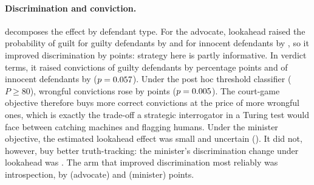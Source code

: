 \paragraph{Discrimination and conviction.}
 decomposes the effect by defendant type. For the advocate, lookahead raised the probability of guilt
for guilty defendants by \AdvLookG{} and for innocent defendants by \AdvLookI{}, so it improved discrimination by
\DiscChgAdvLook{} points: strategy here is partly informative. In verdict terms, it raised convictions of guilty
defendants by \ConvAdvLookG{} percentage points and of innocent defendants by \ConvAdvLookI{} ($p=0.057$).
Under the post hoc threshold classifier ($P\ge80$), wrongful convictions rose by \ConvThrAdvLookI{} points
($p=0.005$). The court-game objective therefore buys more correct convictions at the price of more
wrongful ones, which is exactly the trade-off a strategic interrogator in a Turing test would face between catching
machines and flagging humans. Under the minister objective, the estimated lookahead effect was small and uncertain (\MinLook{}). It did not, however, buy better truth-tracking: the minister's discrimination
change under lookahead was \DiscChgMinLook{}. The arm that improved discrimination most reliably was introspection, by
\DiscChgAdvIntr{} (advocate) and \DiscChgMinIntr{} (minister) points.

